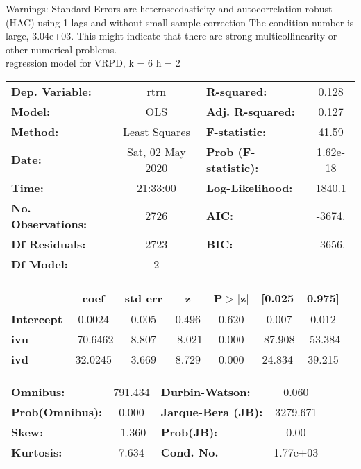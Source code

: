 Warnings: \newline
 [1] Standard Errors are heteroscedasticity and autocorrelation robust (HAC) using 1 lags and without small sample correction \newline
 [2] The condition number is large, 3.04e+03. This might indicate that there are \newline
 strong multicollinearity or other numerical problems.\\ 

regression model for VRPD, k = 6 h = 2\begin{center}
\begin{tabular}{lclc}
\toprule
\textbf{Dep. Variable:}    &       rtrn       & \textbf{  R-squared:         } &     0.128   \\
\textbf{Model:}            &       OLS        & \textbf{  Adj. R-squared:    } &     0.127   \\
\textbf{Method:}           &  Least Squares   & \textbf{  F-statistic:       } &     41.59   \\
\textbf{Date:}             & Sat, 02 May 2020 & \textbf{  Prob (F-statistic):} &  1.62e-18   \\
\textbf{Time:}             &     21:33:00     & \textbf{  Log-Likelihood:    } &    1840.1   \\
\textbf{No. Observations:} &        2726      & \textbf{  AIC:               } &    -3674.   \\
\textbf{Df Residuals:}     &        2723      & \textbf{  BIC:               } &    -3656.   \\
\textbf{Df Model:}         &           2      & \textbf{                     } &             \\
\bottomrule
\end{tabular}
\begin{tabular}{lcccccc}
                   & \textbf{coef} & \textbf{std err} & \textbf{z} & \textbf{P$> |$z$|$} & \textbf{[0.025} & \textbf{0.975]}  \\
\midrule
\textbf{Intercept} &       0.0024  &        0.005     &     0.496  &         0.620        &       -0.007    &        0.012     \\
\textbf{ivu}       &     -70.6462  &        8.807     &    -8.021  &         0.000        &      -87.908    &      -53.384     \\
\textbf{ivd}       &      32.0245  &        3.669     &     8.729  &         0.000        &       24.834    &       39.215     \\
\bottomrule
\end{tabular}
\begin{tabular}{lclc}
\textbf{Omnibus:}       & 791.434 & \textbf{  Durbin-Watson:     } &    0.060  \\
\textbf{Prob(Omnibus):} &   0.000 & \textbf{  Jarque-Bera (JB):  } & 3279.671  \\
\textbf{Skew:}          &  -1.360 & \textbf{  Prob(JB):          } &     0.00  \\
\textbf{Kurtosis:}      &   7.634 & \textbf{  Cond. No.          } & 1.77e+03  \\
\bottomrule
\end{tabular}
\end{center}

